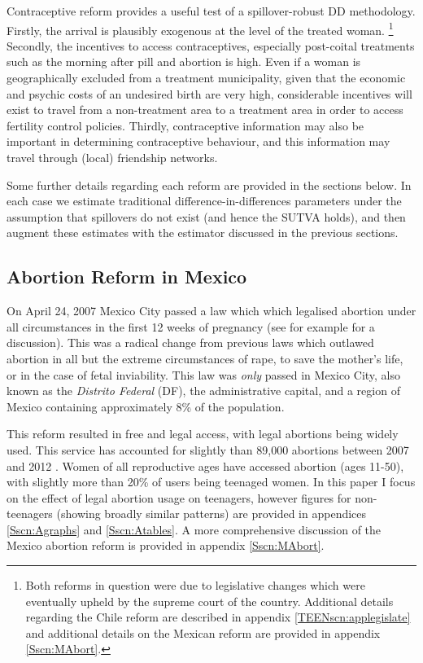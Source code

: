 Contraceptive reform provides a useful test of a spillover-robust DD methodology.
Firstly, the arrival is plausibly exogenous at the level of the treated woman.%
\footnote{Both reforms in question were due to legislative changes which were
eventually upheld by the supreme court of the country.  Additional details 
regarding the Chile reform are described in appendix \ref{TEENscn:applegislate}
and additional details on the Mexican reform are provided in appendix 
\ref{Sscn:MAbort}.}
Secondly, the incentives to access contraceptives, especially post-coital 
treatments such as the morning after pill and abortion is high.  Even if a woman
is geographically excluded from a treatment municipality, given that the economic
and psychic costs of an undesired birth are very high, considerable incentives
will exist to travel from a non-treatment area to a treatment area in order to 
access fertility control policies.  Thirdly, contraceptive information may also 
be important in determining contraceptive behaviour, and this information may 
travel through (local) friendship networks.

Some further details regarding each reform are provided in the sections below.
In each case we estimate traditional difference-in-differences parameters under
the assumption that spillovers do not exist (and hence the SUTVA holds), and
then augment these estimates with the estimator discussed in the previous
sections.

\subsection{Abortion Reform in Mexico}
\label{Ssscn:MexAbort}
On April 24, 2007 Mexico City passed a law which which legalised abortion 
under all circumstances in the first 12 weeks of pregnancy (see for example
\citet{Fraser2014} for a discussion).  This was a radical change from previous 
laws which outlawed abortion in all but the extreme circumstances of rape, 
to save the mother's life, or in the case of fetal inviability.  This law was 
\emph{only} passed in Mexico City, also known as the \emph{Distrito Federal} 
(DF), the administrative capital, and a region of Mexico containing 
approximately 8\% of the population.

This reform resulted in free and legal access, with legal abortions being
widely used.  This service has accounted for slightly than 89,000 abortions
between 2007 and 2012 \citet{Beckeretal2013}.  Women of all reproductive ages
have accessed abortion (ages 11-50), with slightly more than 20\% of users 
being teenaged women.  In this paper I focus on the effect of legal abortion 
usage on teenagers, however figures for non-teenagers (showing broadly similar 
patterns) are provided in appendices \ref{Sscn:Agraphs} and \ref{Sscn:Atables}.  
A more comprehensive discussion of the Mexico abortion reform is provided in 
appendix \ref{Sscn:MAbort}.

